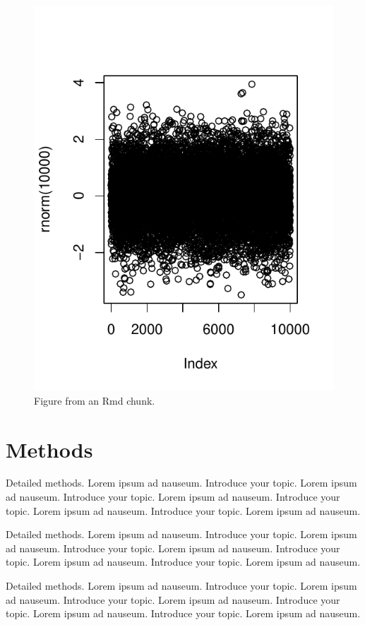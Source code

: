 \documentclass{bioinfo}
\begin{document}
\begin{figure}
\centering
\includegraphics{cilr_manuscript_files/figure-latex/figure-1.pdf}
\caption{Figure from an Rmd chunk.}
\end{figure}

\section{Methods}

Detailed methods. Lorem ipsum ad nauseum. Introduce your topic. Lorem
ipsum ad nauseum. Introduce your topic. Lorem ipsum ad nauseum.
Introduce your topic. Lorem ipsum ad nauseum. Introduce your topic.
Lorem ipsum ad nauseum.

Detailed methods. Lorem ipsum ad nauseum. Introduce your topic. Lorem
ipsum ad nauseum. Introduce your topic. Lorem ipsum ad nauseum.
Introduce your topic. Lorem ipsum ad nauseum. Introduce your topic.
Lorem ipsum ad nauseum.

Detailed methods. Lorem ipsum ad nauseum. Introduce your topic. Lorem
ipsum ad nauseum. Introduce your topic. Lorem ipsum ad nauseum.
Introduce your topic. Lorem ipsum ad nauseum. Introduce your topic.
Lorem ipsum ad nauseum.
\end{document}
